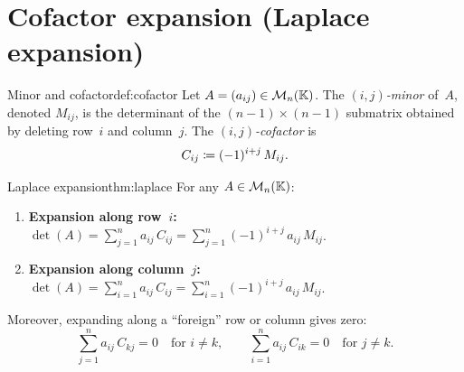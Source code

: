 \section{Cofactor expansion (Laplace expansion)}\label{sec:cofactor}

\begin{definition}{Minor and cofactor}{def:cofactor}
Let $A=(a_{ij})\in\mathcal{M}_n({\mathbb{K}})$. The \emph{$(i,j)$-minor} of~$A$,
denoted $M_{ij}$, is the determinant of the $(n-1)\times(n-1)$
submatrix obtained by deleting row~$i$ and column~$j$. The
\emph{$(i,j)$-cofactor} is
\[
  C_{ij} \coloneqq (-1)^{i+j}\,M_{ij}.
\]
\end{definition}

\begin{theorem}{Laplace expansion}{thm:laplace}
For any $A\in\mathcal{M}_n({\mathbb{K}})$:
\begin{enumerate}[label=(\roman*)]
  \item \textbf{Expansion along row~$i$:}\quad
    $\displaystyle\det(A) = \sum_{j=1}^n a_{ij}\,C_{ij}
     = \sum_{j=1}^n (-1)^{i+j}\,a_{ij}\,M_{ij}$.
  \item \textbf{Expansion along column~$j$:}\quad
    $\displaystyle\det(A) = \sum_{i=1}^n a_{ij}\,C_{ij}
     = \sum_{i=1}^n (-1)^{i+j}\,a_{ij}\,M_{ij}$.
\end{enumerate}
Moreover, expanding along a ``foreign'' row or column gives zero:
\[
  \sum_{j=1}^n a_{ij}\,C_{kj} = 0 \quad\text{for } i\neq k,
  \qquad
  \sum_{i=1}^n a_{ij}\,C_{ik} = 0 \quad\text{for } j\neq k.
\]
\end{theorem}

